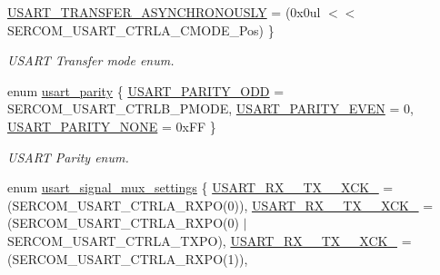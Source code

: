 \begin{DoxyCompactItemize}
\mbox{\hyperlink{group__asfdoc__sam0__sercom__usart__group_gga7ff4d85053b8ea0904b5a57587b39c8fa5662e0cc82a73f113bb13ebb1e4c65ef}{U\+S\+A\+R\+T\+\_\+\+T\+R\+A\+N\+S\+F\+E\+R\+\_\+\+A\+S\+Y\+N\+C\+H\+R\+O\+N\+O\+U\+S\+LY}} = (0x0ul $<$$<$ S\+E\+R\+C\+O\+M\+\_\+\+U\+S\+A\+R\+T\+\_\+\+C\+T\+R\+L\+A\+\_\+\+C\+M\+O\+D\+E\+\_\+\+Pos)
 \}
\begin{DoxyCompactList}\small\item\em U\+S\+A\+RT Transfer mode enum. \end{DoxyCompactList}\item 
enum \mbox{\hyperlink{group__asfdoc__sam0__sercom__usart__group_ga867cc5f0ea7d3bf651d68f0046cf6f41}{usart\+\_\+parity}} \{ \mbox{\hyperlink{group__asfdoc__sam0__sercom__usart__group_gga867cc5f0ea7d3bf651d68f0046cf6f41a69c6cdd4d354d3b26c8d2f09f49d2ede}{U\+S\+A\+R\+T\+\_\+\+P\+A\+R\+I\+T\+Y\+\_\+\+O\+DD}} = S\+E\+R\+C\+O\+M\+\_\+\+U\+S\+A\+R\+T\+\_\+\+C\+T\+R\+L\+B\+\_\+\+P\+M\+O\+DE, 
\mbox{\hyperlink{group__asfdoc__sam0__sercom__usart__group_gga867cc5f0ea7d3bf651d68f0046cf6f41ae5d22c99a30184aff19d77c1a970fb23}{U\+S\+A\+R\+T\+\_\+\+P\+A\+R\+I\+T\+Y\+\_\+\+E\+V\+EN}} = 0, 
\mbox{\hyperlink{group__asfdoc__sam0__sercom__usart__group_gga867cc5f0ea7d3bf651d68f0046cf6f41aecf52ec650226bdc63e12a21d3b5585d}{U\+S\+A\+R\+T\+\_\+\+P\+A\+R\+I\+T\+Y\+\_\+\+N\+O\+NE}} = 0x\+FF
 \}
\begin{DoxyCompactList}\small\item\em U\+S\+A\+RT Parity enum. \end{DoxyCompactList}\item 
enum \mbox{\hyperlink{group__asfdoc__sam0__sercom__usart__group_ga87bbdb9f7edb3f1866aeb498bf7c9077}{usart\+\_\+signal\+\_\+mux\+\_\+settings}} \{ \newline
\mbox{\hyperlink{group__asfdoc__sam0__sercom__usart__group_gga87bbdb9f7edb3f1866aeb498bf7c9077ab2330cf3ae7faacb7fd28678a77327f4}{U\+S\+A\+R\+T\+\_\+\+R\+X\+\_\+\_\+\+T\+X\+\_\+\_\+\+X\+C\+K\+\_}} = (S\+E\+R\+C\+O\+M\+\_\+\+U\+S\+A\+R\+T\+\_\+\+C\+T\+R\+L\+A\+\_\+\+R\+X\+PO(0)), 
\mbox{\hyperlink{group__asfdoc__sam0__sercom__usart__group_gga87bbdb9f7edb3f1866aeb498bf7c9077a4ad0f5cd921dd8c0787ebeba372bcc70}{U\+S\+A\+R\+T\+\_\+\+R\+X\+\_\+\_\+\+T\+X\+\_\+\_\+\+X\+C\+K\+\_}} = (S\+E\+R\+C\+O\+M\+\_\+\+U\+S\+A\+R\+T\+\_\+\+C\+T\+R\+L\+A\+\_\+\+R\+X\+PO(0) $\vert$ S\+E\+R\+C\+O\+M\+\_\+\+U\+S\+A\+R\+T\+\_\+\+C\+T\+R\+L\+A\+\_\+\+T\+X\+PO), 
\mbox{\hyperlink{group__asfdoc__sam0__sercom__usart__group_gga87bbdb9f7edb3f1866aeb498bf7c9077ac937b1e1063cc3d094c4534c022af703}{U\+S\+A\+R\+T\+\_\+\+R\+X\+\_\+\_\+\+T\+X\+\_\+\_\+\+X\+C\+K\+\_}} = (S\+E\+R\+C\+O\+M\+\_\+\+U\+S\+A\+R\+T\+\_\+\+C\+T\+R\+L\+A\+\_\+\+R\+X\+PO(1)), 
$$
\end{DoxyCompactItemize}
